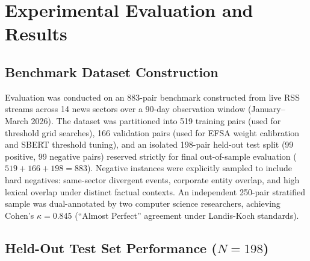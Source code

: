 \documentclass[conference]{IEEEtran}
\begin{document}
\section{Experimental Evaluation and Results}

\subsection{Benchmark Dataset Construction}
Evaluation was conducted on an 883-pair benchmark constructed from live RSS streams across 14 news sectors over a 90-day observation window (January--March 2026).
The dataset was partitioned into 519 training pairs (used for threshold grid searches), 166 validation pairs (used for EFSA weight calibration and SBERT threshold tuning), and an isolated 198-pair held-out test split (99 positive, 99 negative pairs) reserved strictly for final out-of-sample evaluation ($519 + 166 + 198 = 883$).
Negative instances were explicitly sampled to include hard negatives: same-sector divergent events, corporate entity overlap, and high lexical overlap under distinct factual contexts.
An independent 250-pair stratified sample was dual-annotated by two computer science researchers, achieving Cohen's $\kappa = 0.845$ (``Almost Perfect'' agreement under Landis-Koch standards).

\subsection{Held-Out Test Set Performance ($N = 198$)}

\begin{table}[!t]
\centering
\caption{Comparative Performance on Held-Out Test Split ($N=198$)}
\label{tab:perf}
\end{table}
\end{document}
